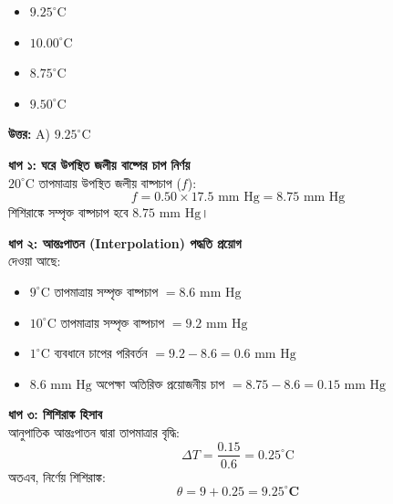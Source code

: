 \documentclass[12pt, a4paper]{article}
\begin{document}
\begin{itemize}[label={}, leftmargin=1cm, itemsep=0.5em]
    \item[\textbf{A)}] $9.25^\circ\text{C}$
    \item[\textbf{B)}] $10.00^\circ\text{C}$
    \item[\textbf{C)}] $8.75^\circ\text{C}$
    \item[\textbf{D)}] $9.50^\circ\text{C}$
\end{itemize}

\vspace{0.5em}
\begin{tcolorbox}[answerbox]
    \textbf{\color{success} উত্তর:} A) $9.25^\circ\text{C}$
\end{tcolorbox}
\vspace{1em}

\begin{tcolorbox}[solutionbox={সমাধান (Solution)}]
    \noindent
    \textbf{ধাপ ১: ঘরে উপস্থিত জলীয় বাষ্পের চাপ নির্ণয়} \\
    $20^\circ\text{C}$ তাপমাত্রায় উপস্থিত জলীয় বাষ্পচাপ ($f$):
    \[ f = 0.50 \times 17.5\text{ mm Hg} = 8.75\text{ mm Hg} \]
    শিশিরাঙ্কে সম্পৃক্ত বাষ্পচাপ হবে $8.75\text{ mm Hg}$।
    
    \vspace{0.4em}
    \noindent\textbf{ধাপ ২: আন্তঃপাতন (Interpolation) পদ্ধতি প্রয়োগ} \\
    দেওয়া আছে:
    \begin{itemize}[leftmargin=1.5em, itemsep=0.2em]
        \item $9^\circ\text{C}$ তাপমাত্রায় সম্পৃক্ত বাষ্পচাপ $= 8.6\text{ mm Hg}$
        \item $10^\circ\text{C}$ তাপমাত্রায় সম্পৃক্ত বাষ্পচাপ $= 9.2\text{ mm Hg}$
        \item $1^\circ\text{C}$ ব্যবধানে চাপের পরিবর্তন $= 9.2 - 8.6 = 0.6\text{ mm Hg}$
        \item $8.6\text{ mm Hg}$ অপেক্ষা অতিরিক্ত প্রয়োজনীয় চাপ $= 8.75 - 8.6 = 0.15\text{ mm Hg}$
    \end{itemize}
    
    \vspace{0.4em}
    \noindent\textbf{ধাপ ৩: শিশিরাঙ্ক হিসাব} \\
    আনুপাতিক আন্তঃপাতন দ্বারা তাপমাত্রার বৃদ্ধি:
    \[ \Delta T = \frac{0.15}{0.6} = 0.25^\circ\text{C} \]
    অতএব, নির্ণেয় শিশিরাঙ্ক:
    \[ \theta = 9 + 0.25 = \mathbf{9.25^\circ\text{C}} \]
\end{tcolorbox}
\end{document}
